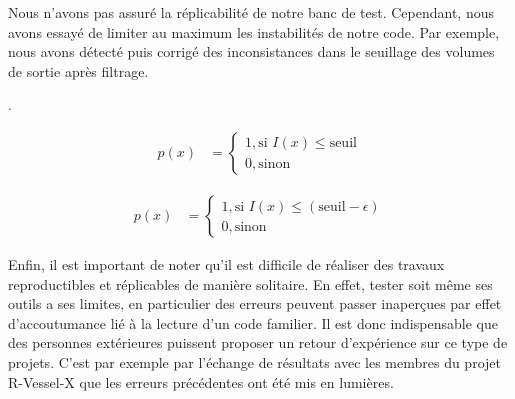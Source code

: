 Nous n'avons pas assuré la réplicabilité de notre banc de test. Cependant, nous avons essayé de limiter au maximum les instabilités de notre code. Par exemple, nous avons détecté puis corrigé des inconsistances dans le seuillage des volumes de sortie après filtrage. 

.

\begin{align}
    p(x) &=
    \begin{cases}
        1, \text{si~} I(x) \leq \text{seuil} \\
        0, \text{sinon}
    \end{cases}
    \label{eq:test_1}
\end{align}
 
 
 \begin{align}
    p(x) &=
    \begin{cases}
        1, \text{si~} I(x) \leq (\text{seuil} - \epsilon) \\
        0, \text{sinon}
    \end{cases}
    \label{eq:test_2}
\end{align}
 

Enfin, il est important de noter qu'il est difficile de réaliser des travaux reproductibles et réplicables de manière solitaire. En effet, tester soit même ses outils a ses limites, en particulier des erreurs peuvent passer inaperçues par effet d'accoutumance lié à la lecture d'un code familier. Il est donc indispensable que des personnes extérieures puissent proposer un retour d'expérience sur ce type de projets. C'est par exemple par l'échange de résultats avec les membres du projet R-Vessel-X que les erreurs précédentes ont été mis en lumières.

